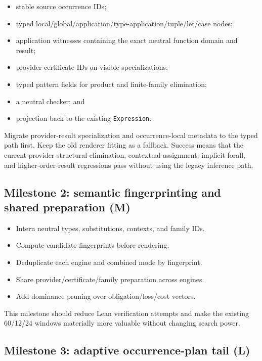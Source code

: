 \documentclass[11pt]{article}
\newcommand{\code}[1]{\texttt{#1}}
\begin{document}
\begin{itemize}
  \item stable source occurrence IDs;
  \item typed local/global/application/type-application/tuple/let/case nodes;
  \item application witnesses containing the exact neutral function domain and
    result;
  \item provider certificate IDs on visible specializations;
  \item typed pattern fields for product and finite-family elimination;
  \item a neutral checker; and
  \item projection back to the existing \code{Expression}.
\end{itemize}

Migrate provider-result specialization and occurrence-local metadata to the
typed path first.  Keep the old renderer fitting as a fallback.  Success means
that the current provider structural-elimination, contextual-assignment,
implicit-forall, and higher-order-result regressions pass without using the
legacy inference path.

\subsection{Milestone 2: semantic fingerprinting and shared preparation (M)}

\begin{itemize}
  \item Intern neutral types, substitutions, contexts, and family IDs.
  \item Compute candidate fingerprints before rendering.
  \item Deduplicate each engine and combined mode by fingerprint.
  \item Share provider/certificate/family preparation across engines.
  \item Add dominance pruning over obligation/loss/cost vectors.
\end{itemize}

This milestone should reduce Lean verification attempts and make the existing
60/12/24 windows materially more valuable without changing search power.

\subsection{Milestone 3: adaptive occurrence-plan tail (L)}
\end{document}
